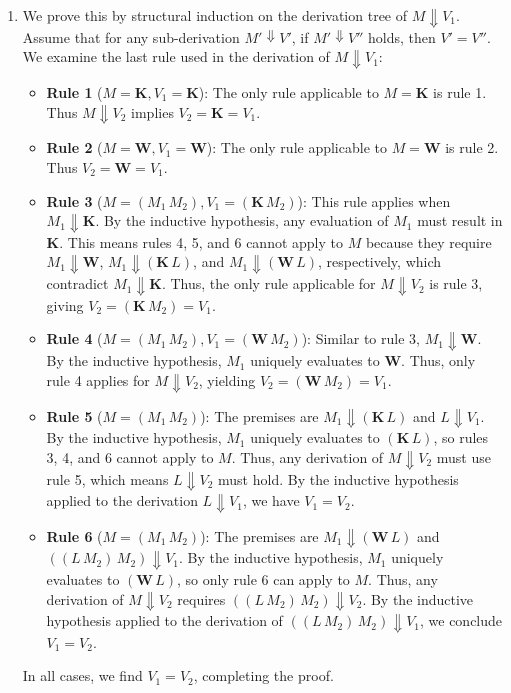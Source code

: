 \documentclass{article}
\begin{document}
\begin{enumerate}[label=\fbox{\arabic*}]
\begin{enumerate}[label=(\arabic*)]
          \item We prove this by structural induction on the derivation tree of $M \Downarrow V_1$. 
          Assume that for any sub-derivation $M' \Downarrow V'$, if $M' \Downarrow V''$ holds, then $V' = V''$. We examine the last rule used in the derivation of $M \Downarrow V_1$:
          \begin{itemize}
            \item \textbf{Rule 1} ($M = \mathbf{K}, V_1 = \mathbf{K}$): The only rule applicable to $M = \mathbf{K}$ is rule 1. Thus $M \Downarrow V_2$ implies $V_2 = \mathbf{K} = V_1$.
            \item \textbf{Rule 2} ($M = \mathbf{W}, V_1 = \mathbf{W}$): The only rule applicable to $M = \mathbf{W}$ is rule 2. Thus $V_2 = \mathbf{W} = V_1$.
            \item \textbf{Rule 3} ($M = (M_1 \, M_2), V_1 = (\mathbf{K} \, M_2)$): This rule applies when $M_1 \Downarrow \mathbf{K}$. By the inductive hypothesis, any evaluation of $M_1$ must result in $\mathbf{K}$. This means rules 4, 5, and 6 cannot apply to $M$ because they require $M_1 \Downarrow \mathbf{W}$, $M_1 \Downarrow (\mathbf{K} \, L)$, and $M_1 \Downarrow (\mathbf{W} \, L)$, respectively, which contradict $M_1 \Downarrow \mathbf{K}$. Thus, the only rule applicable for $M \Downarrow V_2$ is rule 3, giving $V_2 = (\mathbf{K} \, M_2) = V_1$.
            \item \textbf{Rule 4} ($M = (M_1 \, M_2), V_1 = (\mathbf{W} \, M_2)$): Similar to rule 3, $M_1 \Downarrow \mathbf{W}$. By the inductive hypothesis, $M_1$ uniquely evaluates to $\mathbf{W}$. Thus, only rule 4 applies for $M \Downarrow V_2$, yielding $V_2 = (\mathbf{W} \, M_2) = V_1$.
            \item \textbf{Rule 5} ($M = (M_1 \, M_2)$): The premises are $M_1 \Downarrow (\mathbf{K} \, L)$ and $L \Downarrow V_1$. By the inductive hypothesis, $M_1$ uniquely evaluates to $(\mathbf{K} \, L)$, so rules 3, 4, and 6 cannot apply to $M$. Thus, any derivation of $M \Downarrow V_2$ must use rule 5, which means $L \Downarrow V_2$ must hold. By the inductive hypothesis applied to the derivation $L \Downarrow V_1$, we have $V_1 = V_2$.
            \item \textbf{Rule 6} ($M = (M_1 \, M_2)$): The premises are $M_1 \Downarrow (\mathbf{W} \, L)$ and $((L \, M_2) \, M_2) \Downarrow V_1$. By the inductive hypothesis, $M_1$ uniquely evaluates to $(\mathbf{W} \, L)$, so only rule 6 can apply to $M$. Thus, any derivation of $M \Downarrow V_2$ requires $((L \, M_2) \, M_2) \Downarrow V_2$. By the inductive hypothesis applied to the derivation of $((L \, M_2) \, M_2) \Downarrow V_1$, we conclude $V_1 = V_2$.
          \end{itemize}
          In all cases, we find $V_1 = V_2$, completing the proof.
        \end{enumerate}


\end{enumerate}
\end{document}
